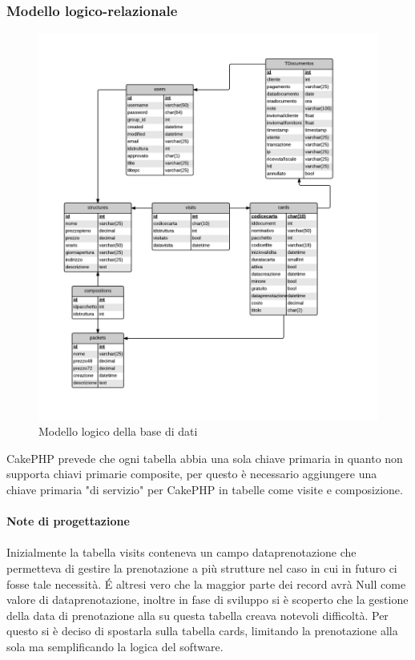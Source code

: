 \subsubsection{Modello logico-relazionale}
\label{logicorelazionale}

\begin{figure}[H]
\centering
\includegraphics[width=1\textwidth]{images/logico.png}
\caption{Modello logico della base di dati}
\end{figure}
CakePHP prevede che ogni tabella abbia una sola chiave primaria in quanto non supporta chiavi primarie composite, per questo è necessario aggiungere una chiave primaria "di servizio" per CakePHP in tabelle come visite e composizione.\\ \\
\textbf{Note di progettazione}\\ \\
Inizialmente la tabella visits conteneva un campo dataprenotazione che permetteva di gestire la prenotazione a più strutture nel caso in cui in futuro ci fosse tale necessità. \'E altresi vero che la maggior parte dei record avrà Null come valore di dataprenotazione, inoltre in fase di sviluppo si è scoperto che la gestione della data di prenotazione alla \cappella su questa tabella creava notevoli difficoltà. Per questo si è deciso di spostarla sulla tabella cards, limitando la prenotazione alla sola \cappella ma semplificando la logica del software. \\

